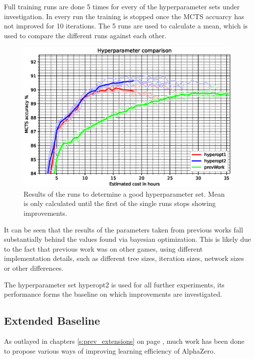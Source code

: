 \documentclass[12pt,onecolumn,oneside,titlepage]{article}
\begin{document}
Full training runs are done 5 times for every of the hyperparameter sets under investigation. In every run the training is stopped once the MCTS accuarcy has not improved for 10 iterations.
The 5 runs are used to calculate a mean, which is used to compare the different runs against each other.

\begin{figure}[H]
\centering
\includegraphics[clip,width=\columnwidth]{hyper_compare}
\caption{Results of the runs to determine a good hyperparameter set. Mean is only calculated until the first of the single runs stops showing improvements.}
\label{fig:hyper_compare_results}
\end{figure}


It can be seen that the results of the parameters taken from previous works fall substantially behind the values found via bayesian optimization. This is likely due to the fact that previous work was on other games, 
using different implementation details, such as different tree sizes, iteration sizes, network sizes or other differences.

The hyperparameter set hyperopt2 is used for all further experiments, its performance forms the baseline on which improvements are investigated.

\subsection{Extended Baseline} \label{s:exexp}

As outlayed in chapters \ref{s:prev_extensions} on page \pageref{s:prev_extensions}, much work has been done to propose various ways of improving learning efficiency of AlphaZero. 
\end{document}
